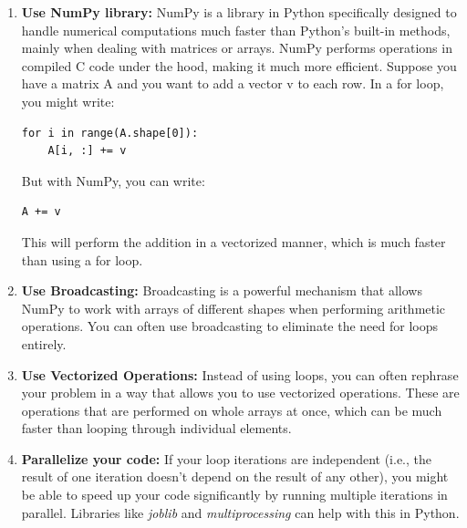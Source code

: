 \documentclass{article}
\begin{document}
\begin{enumerate}
\item \textbf{Use NumPy library:} NumPy is a library in Python specifically designed to handle numerical computations much faster than Python's built-in methods, mainly when dealing with matrices or arrays. NumPy performs operations in compiled C code under the hood, making it much more efficient. Suppose you have a matrix A and you want to add a vector v to each row. In a for loop, you might write:
\begin{verbatim}
for i in range(A.shape[0]):
    A[i, :] += v
\end{verbatim}
But with NumPy, you can write:
\begin{verbatim}
A += v
\end{verbatim}
This will perform the addition in a vectorized manner, which is much faster than using a for loop.

\item \textbf{Use Broadcasting:} Broadcasting is a powerful mechanism that allows NumPy to work with arrays of different shapes when performing arithmetic operations. You can often use broadcasting to eliminate the need for loops entirely.

\item \textbf{Use Vectorized Operations:} Instead of using loops, you can often rephrase your problem in a way that allows you to use vectorized operations. These are operations that are performed on whole arrays at once, which can be much faster than looping through individual elements.

\item \textbf{Parallelize your code:} If your loop iterations are independent (i.e., the result of one iteration doesn't depend on the result of any other), you might be able to speed up your code significantly by running multiple iterations in parallel. Libraries like \textit{joblib} and \textit{multiprocessing} can help with this in Python.

\end{enumerate}
\end{document}
